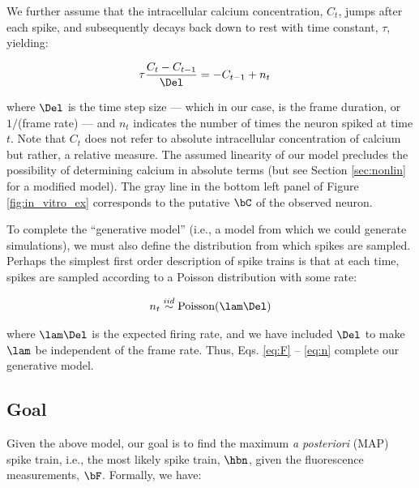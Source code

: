 We further assume that the intracellular calcium concentration, $C_t$, jumps after each spike, and subsequently decays back down to rest with time constant, $\tau$, yielding:


\begin{align} \label{eq:C}
\tau \frac{C_t - C_{t-1}}{\Del} &= - C_{t-1} + n_t
\end{align}

\noindent where $\Del$ is the time step size --- which in our case, is the frame duration, or $1/$(frame rate) --- and $n_t$ indicates the number of times the neuron spiked at time $t$. %
Note that $C_t$ does not refer to absolute intracellular concentration of calcium but rather, a relative measure.  The assumed linearity of our model precludes the possibility of determining calcium in absolute terms (but see Section \ref{sec:nonlin} for a modified model).  The gray line in the bottom left panel of Figure \ref{fig:in_vitro_ex} corresponds to the putative $\bC$ of the observed neuron.  

To complete the ``generative model'' (i.e., a model from which we could generate simulations), we must also define the distribution from which spikes are sampled.  Perhaps the simplest first order description of spike trains is that at each time, spikes are sampled according to a Poisson distribution with some rate:

\begin{align} \label{eq:n}
	n_t \overset{iid}{\sim} \text{Poisson}(\lam \Del)
\end{align}

\noindent where $\lam \Del$ is the expected firing rate, and we have included $\Del$ to make $\lam$ be independent of the frame rate.  Thus, Eqs. \eqref{eq:F} -- \eqref{eq:n} complete our generative model.  






\subsection{Goal} \label{sec:goal}

Given the above model, our goal is to find the maximum \emph{a posteriori} (MAP) spike train, i.e., the most likely spike train, $\hbn$,  given the fluorescence measurements, $\bF$. Formally, we have:

